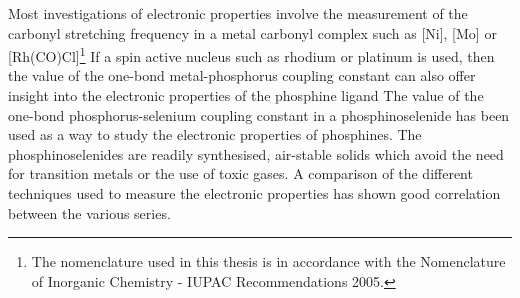 Most investigations of electronic properties involve the measurement of the carbonyl stretching frequency in a metal carbonyl complex such as [Ni], [Mo] or [Rh(CO)Cl]\footnote{The nomenclature used in this thesis is in accordance with the Nomenclature of Inorganic Chemistry - IUPAC Recommendations 2005.\cite{IUPAC2005}}\cite{Tolman1977, Tolman1970, Roodt2003, Banger2009}  If a spin active nucleus such as rhodium or platinum is used, then the value of the one-bond metal-phosphorus coupling constant can also offer insight into the electronic properties of the phosphine ligand\cite{Mann1980, Pregosin2012, Roodt2003, Banger2009}  The value of the one-bond phosphorus-selenium coupling constant in a phosphinoselenide has been used as a way to study the electronic properties of phosphines.\cite{Beckmann2011, Allman1982}  The phosphinoselenides are readily synthesised, air-stable solids which avoid the need for transition metals or the use of toxic gases.  A comparison of the different techniques used to measure the electronic properties has shown good correlation between the various series.\cite{Banger2009}



